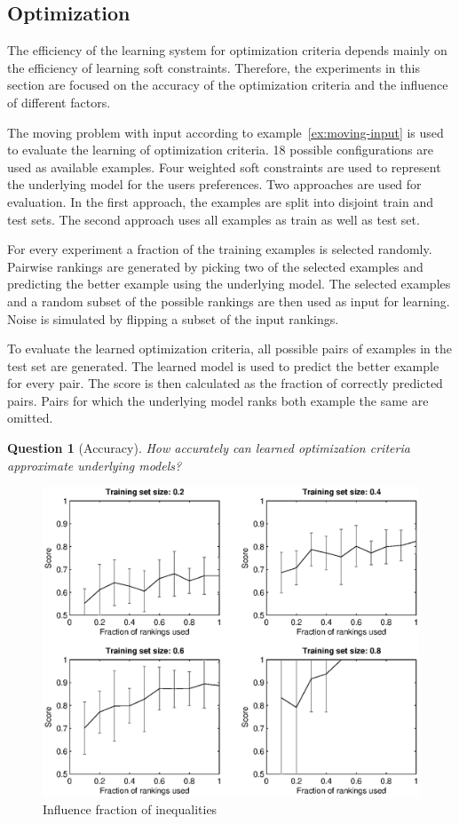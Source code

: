 \documentclass[letterpaper]{article}
\newtheorem{question}{Question}
\theoremstyle{definition}
\begin{document}
\subsection{Optimization}
The efficiency of the learning system for optimization criteria depends mainly on the efficiency of learning soft constraints.
Therefore, the experiments in this section are focused on the accuracy of the optimization criteria and the influence of different factors.

The moving problem with input according to example~\ref{ex:moving-input} is used to evaluate the learning of optimization criteria.
18 possible configurations are used as available examples.
Four weighted soft constraints are used to represent the underlying model for the users preferences.
Two approaches are used for evaluation.
In the first approach, the examples are split into disjoint train and test sets.
The second approach uses all examples as train as well as test set.

For every experiment a fraction of the training examples is selected randomly.
Pairwise rankings are generated by picking two of the selected examples and predicting the better example using the underlying model.
The selected examples and a random subset of the possible rankings are then used as input for learning.
Noise is simulated by flipping a subset of the input rankings.

To evaluate the learned optimization criteria, all possible pairs of examples in the test set are generated.
The learned model is used to predict the better example for every pair.
The score is then calculated as the fraction of correctly predicted pairs. 
Pairs for which the underlying model ranks both example the same are omitted.

\begin{question}[Accuracy]
  How accurately can learned optimization criteria approximate underlying models?
\end{question}

\begin{figure}
  \centering
    \includegraphics[width=1.1\linewidth]{rankings}
  \caption{Influence fraction of inequalities}
  \label{fig:fractie}
\end{figure}
\end{document}
